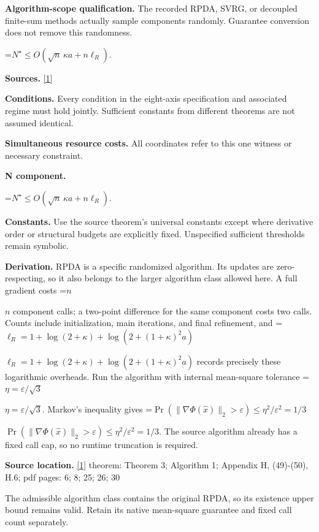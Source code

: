 \documentclass[10pt,a4paper]{article}
\newcommand{\AtlasMath}[1]{\par\begingroup\centering\setbox0=\hbox{$\displaystyle #1$}\ifdim\wd0>1.4\linewidth\typeout{ATLAS WIDE FORMULA: \the\wd0}\fi\ifdim\wd0>\linewidth\resizebox{\linewidth}{!}{\box0}\else\box0\fi\par\endgroup}
\newcommand{\AtlasInlineMath}[1]{\begingroup\setbox0=\hbox{$#1$}\ifdim\wd0>.4\linewidth\endgroup\AtlasMath{#1}\else\endgroup$#1$\fi}
\begin{document}
\textbf{Algorithm-scope qualification.} The recorded RPDA, SVRG, or decoupled finite-sum methods actually sample components randomly. Guarantee conversion does not remove this randomness.



\AtlasMath{N^\star\le O\!\left(\sqrt n\,\kappa a+n\ell_R\right).}


\textbf{Sources.} \href{https://arxiv.org/pdf/2610.04944v1}{[1]}



\textbf{Conditions.} Every condition in the eight-axis specification and associated regime must hold jointly. Sufficient constants from different theorems are not assumed identical.



\textbf{Simultaneous resource costs.} All coordinates refer to this one witness or necessary constraint.



\textbf{N component.}



\AtlasMath{N^\star\le O\!\left(\sqrt n\,\kappa a+n\ell_R\right).}


\textbf{Constants.} Use the source theorem’s universal constants except where derivative order or structural budgets are explicitly fixed. Unspecified sufficient thresholds remain symbolic.



\textbf{Derivation.} RPDA is a specific randomized algorithm. Its updates are zero-respecting, so it also belongs to the larger algorithm class allowed here. A full gradient costs \AtlasInlineMath{n} component calls; a two-point difference for the same component costs two calls. Counts include initialization, main iterations, and final refinement, and \AtlasInlineMath{\ell_R=1+\log(2+\kappa)+\log(2+(1+\kappa)^2a)} records precisely these logarithmic overheads. Run the algorithm with internal mean-square tolerance \AtlasInlineMath{\eta=\varepsilon/\sqrt3}. Markov's inequality gives \AtlasInlineMath{\Pr(\|\nabla\Phi(\widehat x)\|_2>\varepsilon)\le\eta^2/\varepsilon^2=1/3}. The source algorithm already has a fixed call cap, so no runtime truncation is required.



\textbf{Source location.} \href{https://arxiv.org/pdf/2610.04944v1}{[1]} theorem: Theorem 3; Algorithm 1; Appendix H, (49)-(50), H.6; pdf pages: 6; 8; 25; 26; 30



The admissible algorithm class contains the original RPDA, so its existence upper bound remains valid. Retain its native mean-square guarantee and fixed call count separately.
\end{document}
